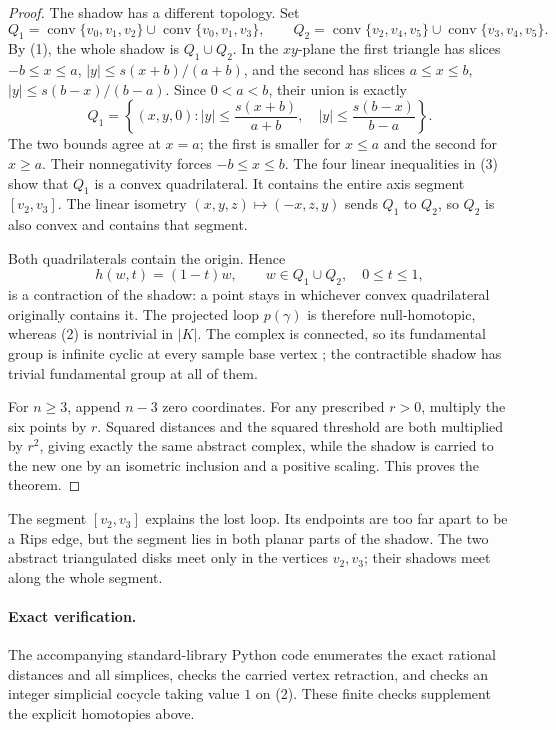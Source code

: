 \documentclass[11pt]{article}
\newcommand{\conv}{\operatorname{conv}}
\begin{document}
\begin{proof}
The shadow has a different topology. Set
\[
 Q_1=\conv\{v_0,v_1,v_2\}\cup\conv\{v_0,v_1,v_3\},\qquad
 Q_2=\conv\{v_2,v_4,v_5\}\cup\conv\{v_3,v_4,v_5\}.
\]
By (1), the whole shadow is $Q_1\cup Q_2$. In the $xy$-plane the first
triangle has slices
$-b\le x\le a$, $|y|\le s(x+b)/(a+b)$, and the second has slices
$a\le x\le b$, $|y|\le s(b-x)/(b-a)$. Since $0<a<b$, their union is exactly
\[
 Q_1=\left\{(x,y,0):
 |y|\le\frac{s(x+b)}{a+b},\quad
 |y|\le\frac{s(b-x)}{b-a}\right\}.\tag{3}
\]
The two bounds agree at $x=a$; the first is smaller for $x\le a$ and the
second for $x\ge a$. Their nonnegativity forces $-b\le x\le b$.
The four linear inequalities in (3) show that $Q_1$ is a convex
quadrilateral. It contains the entire axis segment $[v_2,v_3]$.
The linear isometry $(x,y,z)\mapsto(-x,z,y)$ sends $Q_1$ to $Q_2$,
so $Q_2$ is also convex and contains that segment.

Both quadrilaterals contain the origin. Hence
\[
 h(w,t)=(1-t)w,\qquad w\in Q_1\cup Q_2,\quad 0\le t\le1,
\]
is a contraction of the shadow: a point stays in whichever convex
quadrilateral originally contains it. The projected loop $p(\gamma)$ is
therefore null-homotopic, whereas (2) is nontrivial in $|K|$.
The complex is connected, so its fundamental group is infinite cyclic at
every sample base vertex \cite[Proposition~1.5]{Hatcher}; the contractible
shadow has trivial fundamental group at all of them.

For $n\ge3$, append $n-3$ zero coordinates. For any prescribed $r>0$,
multiply the six points by $r$. Squared distances and the squared threshold
are both multiplied by $r^2$, giving exactly the same abstract complex,
while the shadow is carried to the new one by an isometric inclusion and
a positive scaling. This proves the theorem.
\end{proof}

The segment $[v_2,v_3]$ explains the lost loop. Its endpoints are too far
apart to be a Rips edge, but the segment lies in both planar parts of the
shadow. The two abstract triangulated disks meet only in the vertices
$v_2,v_3$; their shadows meet along the whole segment.

\paragraph{Exact verification.}
The accompanying standard-library Python code enumerates the exact rational
distances and all simplices, checks the carried vertex retraction, and checks
an integer simplicial cocycle taking value $1$ on (2). These finite checks
supplement the explicit homotopies above.
\end{document}
